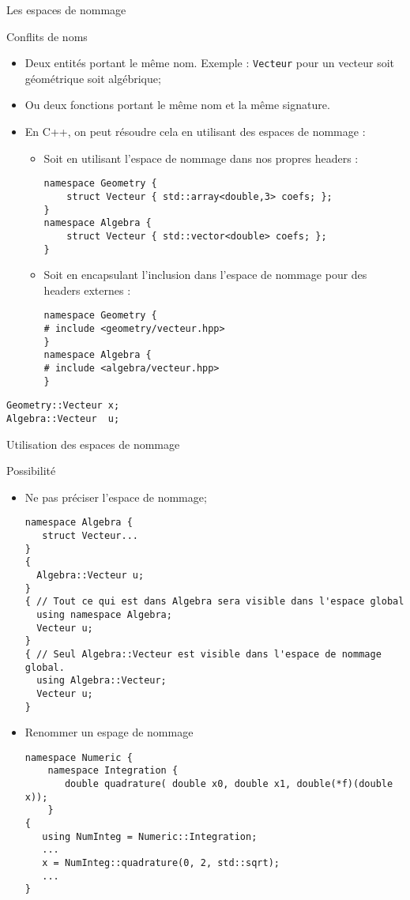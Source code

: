 \documentclass[handout,10pt]{beamer}
\begin{document}
\begin{frame}[fragile]{Les espaces de nommage}
\tiny
\begin{block}{Conflits de noms}
\begin{itemize}
\item Deux entités portant le même nom. Exemple : \lstinline$Vecteur$ pour un vecteur soit géométrique soit algébrique;
\item Ou deux fonctions portant le même nom et la même signature.
\item En C++, on peut résoudre cela en utilisant des espaces de nommage :
\begin{itemize}
\item Soit en utilisant l'espace de nommage dans nos propres headers :
\begin{lstlisting}
namespace Geometry {
    struct Vecteur { std::array<double,3> coefs; };
}
namespace Algebra {
    struct Vecteur { std::vector<double> coefs; };
}
\end{lstlisting}
\item Soit en encapsulant l'inclusion dans l'espace de nommage pour des headers externes :
\begin{lstlisting}
namespace Geometry { 
# include <geometry/vecteur.hpp>
}
namespace Algebra {
# include <algebra/vecteur.hpp>
}
\end{lstlisting}
\end{itemize}
\end{itemize}
\end{block}
\begin{lstlisting}
Geometry::Vecteur x;
Algebra::Vecteur  u;
\end{lstlisting}
\end{frame}


\begin{frame}[fragile]{Utilisation des espaces de nommage}
\tiny
\begin{block}{Possibilité}
\begin{itemize}
\item Ne pas préciser l'espace de nommage;
\begin{lstlisting}
namespace Algebra {
   struct Vecteur...
}
{
  Algebra::Vecteur u;
}
{ // Tout ce qui est dans Algebra sera visible dans l'espace global
  using namespace Algebra;
  Vecteur u;
}
{ // Seul Algebra::Vecteur est visible dans l'espace de nommage global.
  using Algebra::Vecteur;
  Vecteur u;
}
\end{lstlisting}
\item Renommer un espage de nommage
\begin{lstlisting}
namespace Numeric {
    namespace Integration {
       double quadrature( double x0, double x1, double(*f)(double x));
    }
{
   using NumInteg = Numeric::Integration;
   ...
   x = NumInteg::quadrature(0, 2, std::sqrt);
   ...
}
\end{lstlisting}
\end{itemize}
\end{block}
\end{frame}
\end{document}
